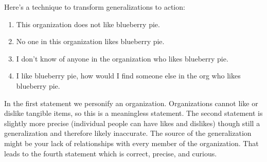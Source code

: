 Here's a technique to transform generalizations to action: 
\begin{enumerate}
    \item This organization does not like blueberry pie.
    \item No one in this organization likes blueberry pie.
    \item I don't know of anyone in the organization who likes blueberry pie.
    \item I like blueberry pie, how would I find someone else in the org who likes blueberry pie.
\end{enumerate}
In the first statement we personify an organization. Organizations cannot like or dislike tangible items, so this is a meaningless statement. The second statement is slightly more precise (individual people can have likes and dislikes) though still a generalization and therefore likely inaccurate. The source of the generalization might be your lack of relationships with every member of the organization. That leads to the fourth statement which is correct, precise, and curious. 